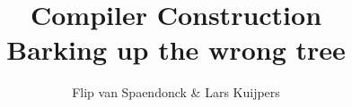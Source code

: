 \documentclass{beamer}
\author[Flip \& Lars]{Flip van Spaendonck \& Lars Kuijpers}
\title{Compiler Construction \\ Barking up the wrong tree}
\begin{document}
\begin{frame}
\titlepage
\end{frame}

\begin{frame}
\end{frame}
\end{document}
